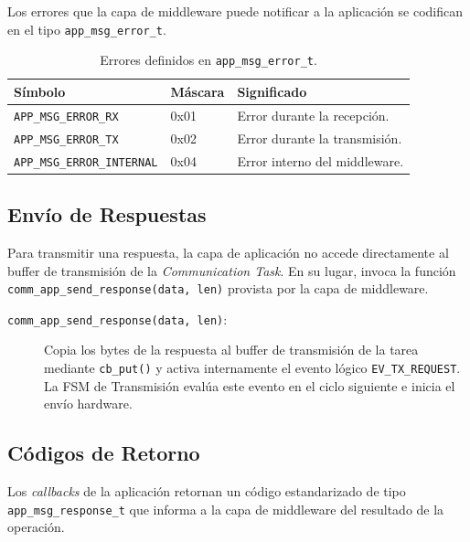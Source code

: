 Los errores que la capa de middleware puede notificar a la aplicación se codifican
en el tipo \texttt{app\_msg\_error\_t}.

\begin{table}[htbp]
    \centering
    \caption{Errores definidos en \texttt{app\_msg\_error\_t}.}
    \label{tab:app-msg-error}
    \begin{tabular}{llp{7cm}}
        \toprule
        \textbf{Símbolo} & \textbf{Máscara} & \textbf{Significado} \\
        \midrule
        \texttt{APP\_MSG\_ERROR\_RX}       & 0x01 & Error durante la recepción. \\
        \texttt{APP\_MSG\_ERROR\_TX}       & 0x02 & Error durante la transmisión. \\
        \texttt{APP\_MSG\_ERROR\_INTERNAL} & 0x04 & Error interno del middleware. \\
        \bottomrule
    \end{tabular}
\end{table}

\subsection{Envío de Respuestas}
\label{subsec:app-envio}

Para transmitir una respuesta, la capa de aplicación no accede directamente al buffer de transmisión de la \textit{Communication Task}. En su lugar, invoca la función \texttt{comm\_app\_send\_response(data, len)} provista por la capa de middleware.

\begin{description}
    \item[\texttt{comm\_app\_send\_response(data, len)}:] Copia los bytes de la respuesta al buffer de transmisión de la tarea mediante \texttt{cb\_put()} y activa internamente el evento lógico \texttt{EV\_TX\_REQUEST}. La FSM de Transmisión evalúa este evento en el ciclo siguiente e inicia el envío hardware.
\end{description}

\subsection{Códigos de Retorno}
\label{subsec:app-retorno}

Los \textit{callbacks} de la aplicación retornan un código estandarizado de tipo \texttt{app\_msg\_response\_t} que informa a la capa de middleware del resultado
de la operación.

